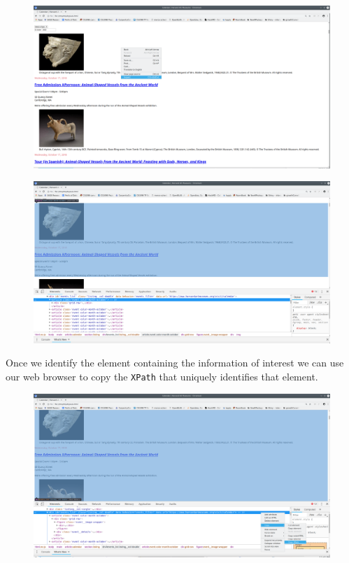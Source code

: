 \documentclass[]{book}
\begin{document}
\begin{figure}
\centering
\includegraphics{Python/PythonWebScrape/images/dev_tools_right_click.png}
\caption{}
\end{figure}

\begin{figure}
\centering
\includegraphics{Python/PythonWebScrape/images/dev_tools_inspect.png}
\caption{}
\end{figure}

Once we identify the element containing the information of interest we
can use our web browser to copy the \texttt{XPath} that uniquely
identifies that element.

\begin{figure}
\centering
\includegraphics{Python/PythonWebScrape/images/dev_tools_xpath.png}
\caption{}
\end{figure}
\end{document}
